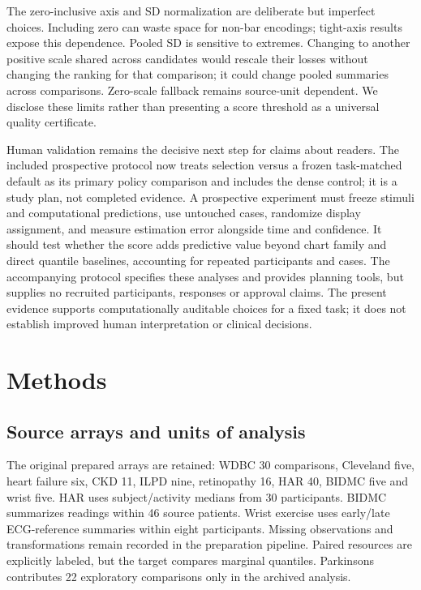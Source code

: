 \documentclass[11pt]{article}
\begin{document}
The zero-inclusive axis and SD normalization are deliberate but imperfect choices. Including zero can waste space for non-bar encodings; tight-axis results expose this dependence. Pooled SD is sensitive to extremes. Changing to another positive scale shared across candidates would rescale their losses without changing the ranking for that comparison; it could change pooled summaries across comparisons. Zero-scale fallback remains source-unit dependent. We disclose these limits rather than presenting a score threshold as a universal quality certificate.

Human validation remains the decisive next step for claims about readers. The included prospective protocol now treats selection versus a frozen task-matched default as its primary policy comparison and includes the dense control; it is a study plan, not completed evidence. A prospective experiment must freeze stimuli and computational predictions, use untouched cases, randomize display assignment, and measure estimation error alongside time and confidence. It should test whether the score adds predictive value beyond chart family and direct quantile baselines, accounting for repeated participants and cases. The accompanying protocol specifies these analyses and provides planning tools, but supplies no recruited participants, responses or approval claims. The present evidence supports computationally auditable choices for a fixed task; it does not establish improved human interpretation or clinical decisions.

\section*{Methods}
\subsection*{Source arrays and units of analysis}
The original prepared arrays are retained: WDBC 30 comparisons, Cleveland five, heart failure six, CKD 11, ILPD nine, retinopathy 16, HAR 40, BIDMC five and wrist five. HAR uses subject/activity medians from 30 participants. BIDMC summarizes readings within 46 source patients. Wrist exercise uses early/late ECG-reference summaries within eight participants.\cite{pimentel2017,jarchi2017} Missing observations and transformations remain recorded in the preparation pipeline. Paired resources are explicitly labeled, but the target compares marginal quantiles. Parkinsons contributes 22 exploratory comparisons only in the archived analysis.
\end{document}
